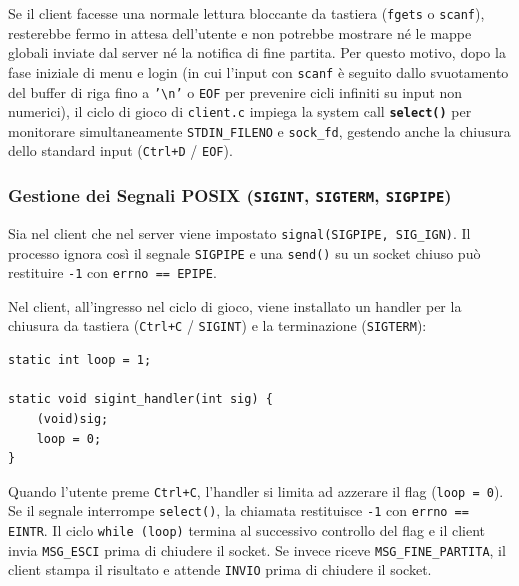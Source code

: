\documentclass[11pt,a4paper]{article}
\begin{document}
Se il client facesse una normale lettura bloccante da tastiera (\texttt{fgets} o \texttt{scanf}), resterebbe fermo in attesa dell'utente e non potrebbe mostrare né le mappe globali inviate dal server né la notifica di fine partita. Per questo motivo, dopo la fase iniziale di menu e login (in cui l'input con \texttt{scanf} è seguito dallo svuotamento del buffer di riga fino a \texttt{'\textbackslash n'} o \texttt{EOF} per prevenire cicli infiniti su input non numerici), il ciclo di gioco di \texttt{client.c} impiega la system call \textbf{\texttt{select()}} per monitorare simultaneamente \texttt{STDIN\_FILENO} e \texttt{sock\_fd}, gestendo anche la chiusura dello standard input (\texttt{Ctrl+D} / \texttt{EOF}).

\subsubsection{Gestione dei Segnali POSIX (\texttt{SIGINT}, \texttt{SIGTERM}, \texttt{SIGPIPE})}
Sia nel client che nel server viene impostato \texttt{signal(SIGPIPE, SIG\_IGN)}. Il processo ignora così il segnale \texttt{SIGPIPE} e una \texttt{send()} su un socket chiuso può restituire \texttt{-1} con \texttt{errno == EPIPE}.

Nel client, all'ingresso nel ciclo di gioco, viene installato un handler per la chiusura da tastiera (\texttt{Ctrl+C} / \texttt{SIGINT}) e la terminazione (\texttt{SIGTERM}):

\begin{lstlisting}[style=cstyle]
static int loop = 1;

static void sigint_handler(int sig) {
    (void)sig;
    loop = 0;
}
\end{lstlisting}


Quando l'utente preme \texttt{Ctrl+C}, l'handler si limita ad azzerare il flag (\texttt{loop = 0}). Se il segnale interrompe \texttt{select()}, la chiamata restituisce \texttt{-1} con \texttt{errno == EINTR}. Il ciclo \texttt{while (loop)} termina al successivo controllo del flag e il client invia \texttt{MSG\_ESCI} prima di chiudere il socket. Se invece riceve \texttt{MSG\_FINE\_PARTITA}, il client stampa il risultato e attende \texttt{INVIO} prima di chiudere il socket.
\end{document}
